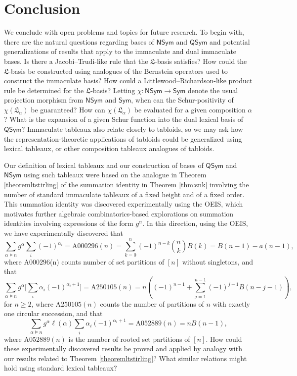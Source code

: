\documentclass{amsart}
\theoremstyle{definition}
\newcommand{\lx}{\mathfrak{L}}
\begin{document}
\section{Conclusion}\label{Conclusionsec}
 We conclude with open problems and topics for future research. To begin with, there are the natural questions regarding bases of 
 $\textsf{NSym}$ and $\textsf{QSym}$   and potential generalizations of results that apply to the immaculate and dual immaculate bases. Is 
 there a Jacobi--Trudi-like rule that the $\lx$-basis satisfies? How could the $\lx$-basis be constructed using analogues of the Bernstein 
 operators \cite{BergBergeronSaliolaSerranoZabrocki2014} used to construct the immaculate basis? How could a 
 Littlewood--Richardson-like product rule be determined for the $\lx$-basis? Letting $\chi\colon \textsf{NSym} \to \textsf{Sym}$ denote the usual projection morphism from $\textsf{NSym}$ and $\textsf{Sym}$, when 
 can the Schur-positivity of $\chi(\lx_{\alpha})$ be guaranteed? How can $\chi(\lx_{\alpha})$ be evaluated for a given 
 composition $\alpha$? 
 What is the expansion of a given Schur function into the dual lexical basis of $\textsf{QSym}$? Immaculate tableaux also relate closely to tabloids, so we may ask how the representation-theoretic applications of tabloids could be generalized using lexical tableaux, or other composition tableaux 
 analogues of tabloids. 
 
 Our definition of lexical tableaux and our construction of bases of $\textsf{QSym}$ and $\textsf{NSym}$ using such tableaux were based 
 on the analogue in Theorem \ref{theoremltstirling} of the summation identity in Theorem \ref{thm:snk} involving the number of standard 
 immaculate tableaux of a fixed height and of a fixed order. This summation identity was discovered experimentally using the OEIS, which 
 motivates further algebraic combinatorics-based explorations on summation identities involving expressions of the form $g^{\alpha}$. 
 In this direction, using the OEIS, we have experimentally discovered that \[ \sum_{\alpha \vDash
 n} g^{\alpha}\sum_{i} (-1)^{\alpha_i} = 
 \text{A000296}(n) = \sum_{k=0}^n (-1)^{n-k} \binom{n}{k}B(k) = B(n-1) - a(n-1), \] where $\text{A000296}$(n) counts number of set 
 partitions of $[n]$ without singletons, and that \[ \sum_{\alpha \vDash 
 n} g^{\alpha} \Bigg[ \sum_{i} \alpha_i (-1)^{\alpha_i+1} \Bigg] = 
 \text{A250105}(n) = n((-1)^{n-1} + \sum_{j=1}^{n-1} (-1)^{j-1}B(n-j-1)),\] for $n \geq 2$, where $\text{A250105}(n)$ counts the 
 number of partitions of $n$ with exactly one circular succession, and that \[ \sum_{\alpha \vDash 
 n} g^{\alpha} \ell(\alpha) 
 \sum_{i} \alpha_i (-1)^{\alpha_i +1} = \text{A052889}(n) = n B(n-1), \] where $\text{A052889}(n)$ is the number of rooted set partitions 
 of $[n]$. How could these experimentally discovered results be proved and applied by analogy with our results related to 
 Theorem \ref{theoremltstirling}? What similar relations might hold using standard lexical tableaux?
 
\end{document}
